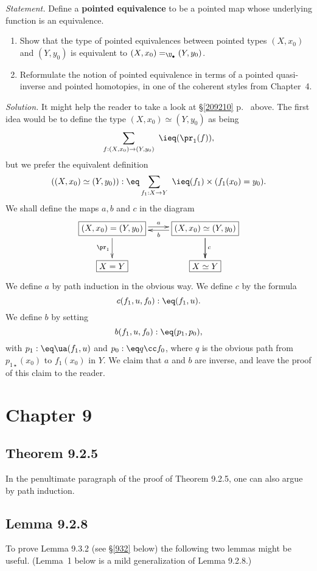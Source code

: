 \documentclass[12pt]{article}
\begin{document}
\emph{Statement.} Define a \textbf{pointed equivalence} to be a pointed map whose underlying function is an equivalence.
\begin{enumerate}
\item Show that the type of pointed equivalences between pointed types $(X,x_0)$ and $(Y,y_0)$ is equivalent to $(X,x_0)=_{\U_\bullet}(Y,y_0)$.
\item Reformulate the notion of pointed equivalence in terms of a pointed quasi-inverse and pointed homotopies, in one of the coherent styles from Chapter~4.
\end{enumerate}
\emph{Solution.} It might help the reader to take a look at \S\ref{209210} p.~\pageref{209210} above. The first idea would be to define the type $(X,x_0)\simeq(Y,y_0)$ as being
$$
\sum_{f:(X,x_0)\to(Y,y_0)}\ \ieq(\pr_1(f)),
$$ 
but we prefer the equivalent definition
$$
((X,x_0)\simeq(Y,y_0)):\eq\sum_{f_1:X\to Y}\ \ieq(f_1)\times(f_1(x_0)=y_0).
$$ 
We shall define the maps $a,b$ and $c$ in the diagram 
$$
\xymatrix{
\boxed{(X,x_0)=(Y,y_0)}\ar[d]_{\pr_1}\ar@<2pt>[r]^a&\boxed{(X,x_0)\simeq(Y,y_0)}\ar@<2pt>[l]^b\ar[d]\ar[d]^c\\ 
\boxed{X=Y}&\boxed{X\simeq Y}}
$$ 
We define $a$ by path induction in the obvious way. We define $c$ by the formula 
$$
c(f_1,u,f_0):\eq(f_1,u).
$$ 
We define $b$ by setting 
$$
b(f_1,u,f_0):\eq(p_1,p_0),
$$ 
with $p_1:\eq\ua(f_1,u)$ and $p_0:\eq q\cc f_0$, where $q$ is the obvious path from $p_{1\star}(x_0)$ to $f_1(x_0)$ in $Y$. We claim that $a$ and $b$ are inverse, and leave the proof of this claim to the reader.


\section{Chapter 9}

\subsection{Theorem 9.2.5}

In the penultimate paragraph of the proof of Theorem 9.2.5, one can also argue by path induction.


\subsection{Lemma 9.2.8}\label{928}

To prove Lemma 9.3.2 (see \S\ref{932} below) the following two lemmas might be useful. (Lemma~1 below is a mild generalization of Lemma 9.2.8.)
\end{document}
